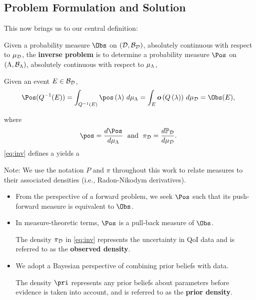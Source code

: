 \subsection{Problem Formulation and Solution}
\begin{frame}[t]
This now brings us to our central definition:

\begin{defn}\label{defn:consistency}
Given a probability measure $\Obs$ on $(\mathcal{D}, \mathcal{B}_{\mathcal{D}})$, absolutely continuous with respect to $\mu_{\mathcal{D}}$, the \textbf{inverse problem} is to determine a probability measure $\Pos$ on $({\Lambda}, \mathcal{B}_{{\Lambda}})$, absolutely continuous with respect to $\mu_{\Lambda}$, 

Given an event $E \in \mathcal{B}_{\mathcal{D}}$,
\begin{equation}\label{eq:inv}
\Pos(Q^{-1}(E)) = \int_{Q^{-1}(E)} \pos \lam \, d\mu_\pspace = \int_E \obs \q \, d\mu_\dspace = \Obs(E),
\end{equation} 

where 
\begin{equation*}
\pos = \frac{d\Pos}{d\mu_\pspace} \;\text{ and }\; \pi_\dspace = \frac{d\PP_\dspace}{d\mu_\dspace}.
\end{equation*}
\eqref{eq:inv} defines a  yields a 
\end{defn}

Note: {\scriptsize We use the notation $P$ and $\pi$ throughout this work to relate measures to their associated densities (i.e., Radon-Nikodym derivatives).}
\end{frame}


\begin{frame}[t]
\begin{itemize}
	\item <1-> From the perspective of a forward problem, we seek $\Pos$ such that its push-forward measure is equivalent to $\Obs$. 
	
	\item <2-> In measure-theoretic terms, $\Pos$ is a pull-back measure of $\Obs$.
	\begin{defn}\label{defn:obsden}
The density $\pi_{\mathcal{D}}$ in \eqref{eq:inv} represents the uncertainty in QoI data and is referred to as the \textbf{observed density}.
\end{defn}

	\item <3-> We adopt a Bayesian perspective of combining prior beliefs with data. 
	\begin{defn}\label{defn:priorden}
The density $\pri$ represents any prior beliefs about parameters before evidence is taken into account, and is referred to as the \textbf{prior density}.
\end{defn}

\end{itemize}

\end{frame}

